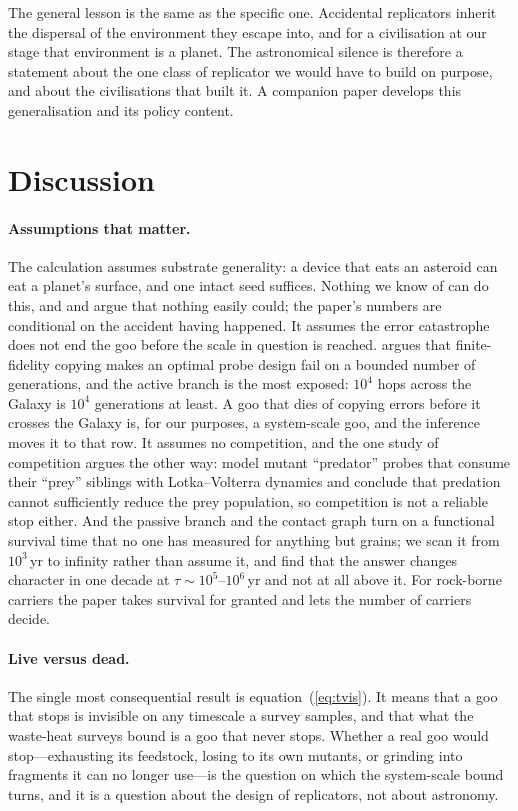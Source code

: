 \documentclass[11pt]{article}
\begin{document}
The general lesson is the same as the specific one.  Accidental replicators
inherit the dispersal of the environment they escape into, and for a
civilisation at our stage that environment is a planet.  The astronomical
silence is therefore a statement about the one class of replicator we would
have to build on purpose, and about the civilisations that built it.  A
companion paper develops this generalisation and its policy content.

\section{Discussion}
\label{sec:discussion}

\paragraph{Assumptions that matter.}  The calculation assumes substrate
generality: a device that eats an asteroid can eat a planet's surface, and one
intact seed suffices.  Nothing we know of can do this, and
\citet{PhoenixDrexler2004} and \citet{Freitas2000} argue that nothing easily
could; the paper's numbers are conditional on the accident having happened.
It assumes the error catastrophe does not end the goo before the scale in
question is reached.  \citet{Kowald2015} argues that finite-fidelity copying
makes an optimal probe design fail on a bounded number of generations, and the
active branch is the most exposed: $10^{4}$ hops across the Galaxy is $10^{4}$
generations at least.  A goo that dies of copying errors before it crosses the
Galaxy is, for our purposes, a system-scale goo, and the inference moves it
to that row.  It assumes no competition, and the one study of
competition argues the other way: \citet{Chen2022} model mutant ``predator''
probes that consume their ``prey'' siblings with Lotka--Volterra dynamics and
conclude that predation cannot sufficiently reduce the prey population, so
competition is not a reliable stop either.  And the passive branch and the
contact graph turn on a functional survival time that no one has measured for
anything but grains; we scan it from $10^{3}$\,yr to infinity rather than
assume it, and find that the answer changes character in one decade at
$\tau\sim10^{5}$--$10^{6}$\,yr and not at all above it.  For rock-borne
carriers the paper takes survival for granted and lets the number of carriers
decide.

\paragraph{Live versus dead.}  The single most consequential result is
equation~(\ref{eq:tvis}).  It means that a goo that stops is invisible on any
timescale a survey samples, and that what the waste-heat surveys bound is a
goo that never stops.  Whether a real goo would stop---exhausting its
feedstock, losing to its own mutants, or grinding into fragments it can no
longer use---is the question on which the system-scale bound turns, and it is
a question about the design of replicators, not about astronomy.
\end{document}
